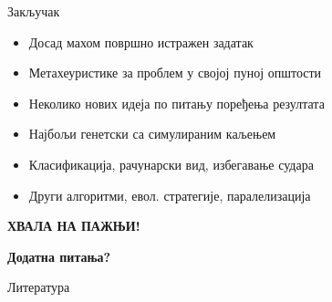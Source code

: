 \documentclass{beamer}
\begin{document}
\begin{frame}{Закључак}
\begin{itemize}
\item Досад махом површно истражен задатак

\item Метахеуристике за проблем у својој пуној општости

\item Неколико нових идеја по питању поређења резултата

\item Најбољи генетски са симулираним каљењем

\item Класификација, рачунарски вид, избегавање судара

\item Други алгоритми, евол. стратегије, паралелизација
\end{itemize}
\end{frame}

\begin{frame}
\centering \LARGE
\textbf{ХВАЛА НА ПАЖЊИ!}

\textbf{Додатна питања?}
\end{frame}

\begin{frame}{Литература}
\nocite{*}


\end{frame}
\end{document}
